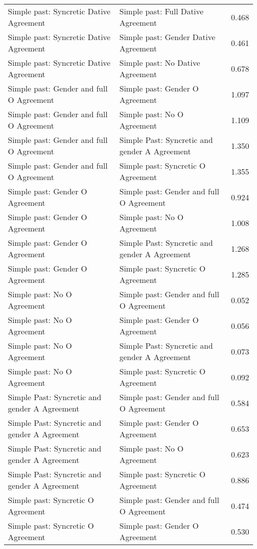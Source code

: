 \begin{longtable}{p{.4\linewidth}p{.4\linewidth}p{.1\linewidth}}
Simple past: Syncretic Dative Agreement & Simple past: Full Dative Agreement & 0.468\\
Simple past: Syncretic Dative Agreement & Simple past: Gender Dative Agreement & 0.461\\
Simple past: Syncretic Dative Agreement & Simple past: No Dative Agreement & 0.678\\
Simple past: Gender and full O Agreement & Simple past: Gender O Agreement & 1.097\\
Simple past: Gender and full O Agreement & Simple past: No O Agreement & 1.109\\
Simple past: Gender and full O Agreement & Simple Past: Syncretic and gender A Agreement & 1.350\\
Simple past: Gender and full O Agreement & Simple past: Syncretic O Agreement & 1.355\\
Simple past: Gender O Agreement & Simple past: Gender and full O Agreement & 0.924\\
Simple past: Gender O Agreement & Simple past: No O Agreement & 1.008\\
Simple past: Gender O Agreement & Simple Past: Syncretic and gender A Agreement & 1.268\\
Simple past: Gender O Agreement & Simple past: Syncretic O Agreement & 1.285\\
Simple past: No O Agreement & Simple past: Gender and full O Agreement & 0.052\\
Simple past: No O Agreement & Simple past: Gender O Agreement & 0.056\\
Simple past: No O Agreement & Simple Past: Syncretic and gender A Agreement & 0.073\\
Simple past: No O Agreement & Simple past: Syncretic O Agreement & 0.092\\
Simple Past: Syncretic and gender A Agreement & Simple past: Gender and full O Agreement & 0.584\\
Simple Past: Syncretic and gender A Agreement & Simple past: Gender O Agreement & 0.653\\
Simple Past: Syncretic and gender A Agreement & Simple past: No O Agreement & 0.623\\
Simple Past: Syncretic and gender A Agreement & Simple past: Syncretic O Agreement & 0.886\\
Simple past: Syncretic O Agreement & Simple past: Gender and full O Agreement & 0.474\\
Simple past: Syncretic O Agreement & Simple past: Gender O Agreement & 0.530\\

\end{longtable}
